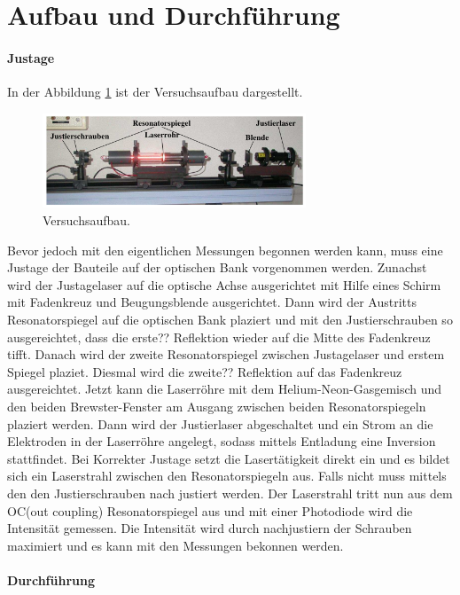 \section{Aufbau und Durchführung}
\label{sec:Durchführung}
\paragraph{Justage}
In der Abbildung \ref{fig:aufbau} ist
der Versuchsaufbau dargestellt.
\begin{figure}
  \centering
  \includegraphics[width=0.7\textwidth]{figures/Aufbau.PNG}
  \caption{Versuchsaufbau.}
  \label{fig:aufbau}
\end{figure}
Bevor jedoch mit den eigentlichen Messungen
begonnen werden
kann, muss eine Justage der Bauteile auf der optischen Bank vorgenommen werden.
Zunachst wird der Justagelaser auf die optische Achse
ausgerichtet
mit Hilfe eines Schirm mit Fadenkreuz und Beugungsblende
ausgerichtet.
Dann wird der Austritts Resonatorspiegel
auf die optischen Bank plaziert
und mit den Justierschrauben so ausgereichtet,
dass die erste?? Reflektion wieder auf die
Mitte des Fadenkreuz tifft.
Danach wird der
zweite Resonatorspiegel zwischen Justagelaser
und erstem Spiegel plaziet.
Diesmal wird die zweite?? Reflektion
auf das Fadenkreuz ausgereichtet.
Jetzt kann die Laserröhre mit dem Helium-Neon-Gasgemisch und
den beiden Brewster-Fenster am Ausgang
zwischen beiden Resonatorspiegeln
plaziert werden.
Dann wird der Justierlaser abgeschaltet
und ein Strom an die
Elektroden in der Laserröhre
angelegt, sodass mittels Entladung eine Inversion
stattfindet. Bei Korrekter
Justage setzt die Lasertätigkeit direkt ein
und es bildet sich ein Laserstrahl
zwischen den Resonatorspiegeln aus.
Falls nicht muss mittels den den Justierschrauben
nach justiert werden.
Der Laserstrahl tritt nun aus dem OC(out coupling) Resonatorspiegel
aus und mit einer Photodiode wird die Intensität gemessen.
Die Intensität wird durch nachjustiern der Schrauben maximiert und
es kann mit den Messungen bekonnen werden.



\paragraph{Durchführung}
